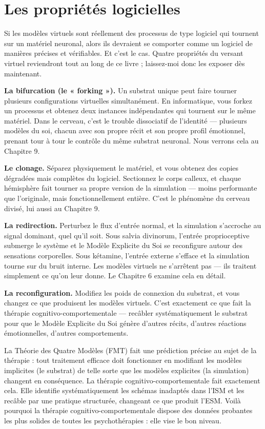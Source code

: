 \documentclass[11pt, twoside, openright]{book}
\begin{document}
\section*{Les propriétés logicielles}

Si les modèles virtuels sont réellement des processus de type logiciel qui tournent sur un matériel neuronal, alors ils devraient se comporter comme un logiciel de manières précises et vérifiables. Et c'est le cas. Quatre propriétés du versant virtuel reviendront tout au long de ce livre ; laissez-moi donc les exposer dès maintenant.

\textbf{La bifurcation (le « forking »).} Un substrat unique peut faire tourner plusieurs configurations virtuelles simultanément. En informatique, vous forkez un processus et obtenez deux instances indépendantes qui tournent sur le même matériel. Dans le cerveau, c'est le trouble dissociatif de l'identité --- plusieurs modèles du soi, chacun avec son propre récit et son propre profil émotionnel, prenant tour à tour le contrôle du même substrat neuronal. Nous verrons cela au Chapitre 9.

\textbf{Le clonage.} Séparez physiquement le matériel, et vous obtenez des copies dégradées mais complètes du logiciel. Sectionnez le corps calleux, et chaque hémisphère fait tourner sa propre version de la simulation --- moins performante que l'originale, mais fonctionnellement entière. C'est le phénomène du cerveau divisé, lui aussi au Chapitre 9.

\textbf{La redirection.} Perturbez le flux d'entrée normal, et la simulation s'accroche au signal dominant, quel qu'il soit. Sous salvia divinorum, l'entrée proprioceptive submerge le système et le Modèle Explicite du Soi se reconfigure autour des sensations corporelles. Sous kétamine, l'entrée externe s'efface et la simulation tourne sur du bruit interne. Les modèles virtuels ne s'arrêtent pas --- ils traitent simplement ce qu'on leur donne. Le Chapitre 6 examine cela en détail.

\textbf{La reconfiguration.} Modifiez les poids de connexion du substrat, et vous changez ce que produisent les modèles virtuels. C'est exactement ce que fait la thérapie cognitivo-comportementale --- recâbler systématiquement le substrat pour que le Modèle Explicite du Soi génère d'autres récits, d'autres réactions émotionnelles, d'autres comportements.

La Théorie des Quatre Modèles (FMT) fait une prédiction précise au sujet de la thérapie : tout traitement efficace doit fonctionner en modifiant les modèles implicites (le substrat) de telle sorte que les modèles explicites (la simulation) changent en conséquence. La thérapie cognitivo-comportementale fait exactement cela. Elle identifie systématiquement les schémas inadaptés dans l'ISM et les recâble par une pratique structurée, changeant ce que produit l'ESM. Voilà pourquoi la thérapie cognitivo-comportementale dispose des données probantes les plus solides de toutes les psychothérapies : elle vise le bon niveau.
\end{document}
